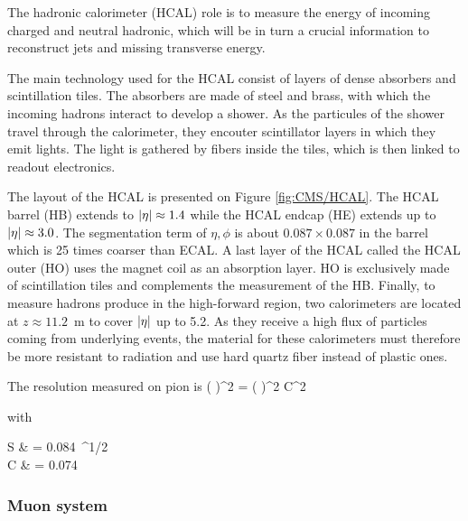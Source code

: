         The hadronic calorimeter (HCAL) role is to measure the energy of incoming charged
        and neutral hadronic, which will be in turn a crucial information to reconstruct
        jets and missing transverse energy.

        The main technology used for the HCAL consist of layers of dense absorbers and
        scintillation tiles. The absorbers are made of steel and brass, with which
        the incoming hadrons interact to develop a shower. As the particules of the shower
        travel through the calorimeter, they encouter scintillator layers in which they
        emit lights. The light is gathered by fibers inside the tiles, which is then
        linked to readout electronics.


        The layout of the HCAL is presented on Figure \ref{fig:CMS/HCAL}. The HCAL barrel
        (HB) extends to $\left| \eta \right| \approx 1.4$ while the HCAL endcap (HE) extends up to
        $\left| \eta \right| \approx 3.0$. The segmentation term of $\eta,\phi$ is about $0.087 \times 0.087$
        in the barrel which is 25 times coarser than ECAL. A last layer of the HCAL called
        the HCAL outer (HO) uses the magnet coil as an absorption layer. HO is exclusively
        made of scintillation tiles and complements the measurement of the HB. Finally, to
        measure hadrons produce in the high-forward region, two calorimeters are located at
        $z \approx 11.2$~m to cover $\left| \eta \right|$ up to 5.2. As they receive a high flux of
        particles coming from underlying events, the material for these calorimeters must
        therefore be more resistant to radiation and use hard quartz fiber instead of
        plastic ones.

        The resolution measured on pion is
        {
            \left(  \right)^2
            =
            \left(  \right)^2
            \oplus
            C^2
        }

        with

        {
            S & = 0.084~^{1/2} \\
            C & = 0.074\nonumber
        }

            \subsubsection{Muon system}

